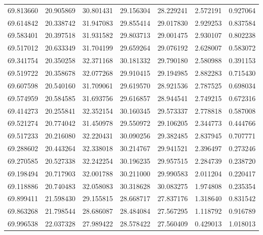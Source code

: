 \begin{tabular}{rrrrrrr}
 69.813660 &  20.905869 &         30.801431 &         29.156304 &         28.229241 &  2.572191 &  0.927064 \\
 69.614842 &  20.338742 &         31.947083 &         29.855414 &         29.017830 &  2.929253 &  0.837584 \\
 69.583401 &  20.397518 &         31.931582 &         29.803713 &         29.001475 &  2.930107 &  0.802238 \\
 69.517012 &  20.633349 &         31.704199 &         29.659264 &         29.076192 &  2.628007 &  0.583072 \\
 69.341754 &  20.350258 &         32.371168 &         30.181332 &         29.790180 &  2.580988 &  0.391153 \\
 69.519722 &  20.358678 &         32.077268 &         29.910415 &         29.194985 &  2.882283 &  0.715430 \\
 69.607598 &  20.540160 &         31.709061 &         29.619570 &         28.921536 &  2.787525 &  0.698034 \\
 69.574959 &  20.584585 &         31.693756 &         29.616857 &         28.944541 &  2.749215 &  0.672316 \\
 69.414273 &  20.255841 &         32.352154 &         30.160345 &         29.573337 &  2.778818 &  0.587008 \\
 69.521274 &  20.774042 &         31.450978 &         29.550972 &         29.106205 &  2.344773 &  0.444766 \\
 69.517233 &  20.216080 &         32.220431 &         30.090256 &         29.382485 &  2.837945 &  0.707771 \\
 69.288602 &  20.443264 &         32.338018 &         30.214767 &         29.941521 &  2.396497 &  0.273246 \\
 69.270585 &  20.527338 &         32.242254 &         30.196235 &         29.957515 &  2.284739 &  0.238720 \\
 69.198494 &  20.717903 &         32.001788 &         30.211000 &         29.990583 &  2.011204 &  0.220417 \\
 69.118886 &  20.740483 &         32.058083 &         30.318628 &         30.083275 &  1.974808 &  0.235354 \\
 69.899411 &  21.598430 &         29.155815 &         28.668717 &         27.837176 &  1.318640 &  0.831542 \\
 69.863268 &  21.798544 &         28.686087 &         28.484084 &         27.567295 &  1.118792 &  0.916789 \\
 69.996538 &  22.037328 &         27.989422 &         28.578422 &         27.560409 &  0.429013 &  1.018013 \\

\end{tabular}
